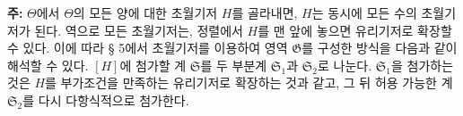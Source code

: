 
\textbf{주:} $\Theta$에서 $\Theta$의 모든 양에 대한 초월기저 $H$를 골라내면, $H$는 동시에 모든 수의 초월기저가 된다. 역으로 모든 초월기저는, 정렬에서 $H$를 맨 앞에 놓으면 유리기저로 확장할 수 있다. 이에 따라 § 5에서 초월기저를 이용하여 영역 $\mathfrak G$를 구성한 방식을 다음과 같이 해석할 수 있다. $[H]$에 첨가할 계 $\mathfrak S$를 두 부분계 $\mathfrak S_1$과 $\mathfrak S_2$로 나눈다. $\mathfrak S_1$을 첨가하는 것은 $H$를 부가조건을 만족하는 유리기저로 확장하는 것과 같고, 그 뒤 허용 가능한 계 $\mathfrak S_2$를 다시 다항식적으로 첨가한다.
